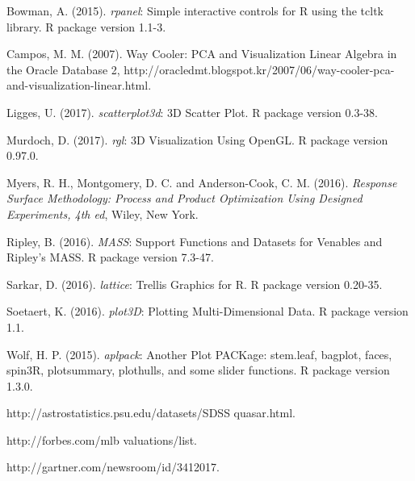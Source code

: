 \documentclass[12pt]{article}
\begin{document}
\begin{description}

\item
Bowman, A. (2015). \textit{rpanel}: Simple interactive controls for R using the tcltk library. R package version 1.1-3.

\item
Campos, M. M. (2007). Way Cooler: PCA and Visualization Linear Algebra in the Oracle Database 2, http://oracledmt.blogspot.kr/2007/06/way-cooler-pca-and-visualization-linear.html.

\item
Ligges, U. (2017). \textit{scatterplot3d}: 3D Scatter Plot. R package version 0.3-38.

\item
Murdoch, D. (2017). \textit{rgl}: 3D Visualization Using OpenGL. R package version 0.97.0.

\item
Myers, R. H., Montgomery, D. C. and Anderson-Cook, C. M. (2016). \textit{Response Surface Methodology: Process and Product Optimization Using Designed Experiments, 4th ed}, Wiley, New York.

\item
Ripley, B. (2016). \textit{MASS}: Support Functions and Datasets for Venables and Ripley's MASS. R package version 7.3-47.

\item
Sarkar, D. (2016). \textit{lattice}: Trellis Graphics for R. R package version 0.20-35.

\item
Soetaert, K. (2016). \textit{plot3D}: Plotting Multi-Dimensional Data. R package version 1.1.

\item
Wolf, H. P. (2015). \textit{aplpack}: Another Plot PACKage: stem.leaf, bagplot, faces, spin3R, plotsummary, plothulls, and some slider functions. R package version 1.3.0.

\item
http://astrostatistics.psu.edu/datasets/SDSS quasar.html.

\item
http://forbes.com/mlb valuations/list.

\item
http://gartner.com/newsroom/id/3412017.

\end{description}
\end{document}
